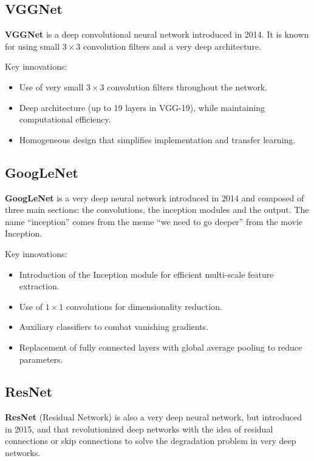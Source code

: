 \subsection{VGGNet}

\textbf{VGGNet} is a deep convolutional neural network introduced in 2014. It is known for using small \(3 \times 3\) convolution filters and a very deep architecture.

Key innovations:
\begin{itemize}
    \item Use of very small \(3 \times 3\) convolution filters throughout the network.  
    \item Deep architecture (up to 19 layers in VGG-19), while maintaining computational efficiency.
    \item Homogeneous design that simplifies implementation and transfer learning.  
\end{itemize}

\subsection{GoogLeNet}

\textbf{GoogLeNet} is a very deep neural network introduced in 2014 and composed of three main sections: the convolutions, the inception modules and the output. The name ``inception'' comes from the meme ``we need to go deeper'' from the movie Inception.

Key innovations:
\begin{itemize}
    \item Introduction of the Inception module for efficient multi-scale feature extraction.  
    \item Use of $1\times 1$ convolutions for dimensionality reduction.  
    \item Auxiliary classifiers to combat vanishing gradients.  
    \item Replacement of fully connected layers with global average pooling to reduce parameters.
\end{itemize}

\subsection{ResNet}

\textbf{ResNet} (Residual Network) is also a very deep neural network, but introduced in 2015, and that revolutionized deep networks with the idea of residual connections or skip connections to solve the degradation problem in very deep networks.

